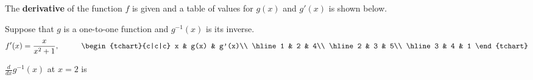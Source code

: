 \documentclass{ximera}
\author{Gregory Hartman \and Matthew Carr}
\begin{document}
\begin{exercise}



The \textbf{derivative} of the function $f$ is given and a table of values for $g(x)$ and $g'(x)$ is shown below.

Suppose that $g$ is a one-to-one function and $g^{-1}(x)$ is its inverse.
\[
f'(x)=\frac{x}{x^2+1},\hskip 1cm
\begin{tchart}{c|c|c}
x & g(x) & g'(x)\\ \hline
1 & 2 & 4\\ \hline
2 & 3 & 5\\ \hline
3 & 4 & 1
\end{tchart}
\]

$\frac{d}{dx}g^{-1}(x)$ at $x=2$ is
\begin{prompt}
\begin{multipleChoice}
\end{multipleChoice}
\end{prompt}

\end{exercise}
\end{document}
